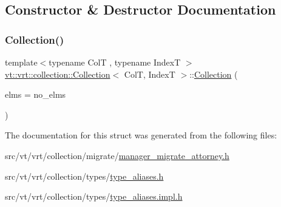\subsection{Constructor \& Destructor Documentation}
\mbox{\label{structvt_1_1vrt_1_1collection_1_1_collection_a1781c529f6184d1befe7e7d0781f6f50}} 
\subsubsection{\texorpdfstring{Collection()}{Collection()}}
{\footnotesize\ttfamily template$<$typename ColT , typename IndexT $>$ \\
\hyperlink{structvt_1_1vrt_1_1collection_1_1_collection}{vt\+::vrt\+::collection\+::\+Collection}$<$ ColT, IndexT $>$\+::\hyperlink{structvt_1_1vrt_1_1collection_1_1_collection}{Collection} (\begin{DoxyParamCaption}\item[{\hyperlink{namespacevt_ac115668758184050beff7a9281a2c490}{Virtual\+Elm\+Count\+Type} const}]{elms = {\ttfamily no\+\_\+elms} }\end{DoxyParamCaption})\hspace{0.3cm}{\ttfamily [explicit]}}



The documentation for this struct was generated from the following files\+:\begin{DoxyCompactItemize}
\item 
src/vt/vrt/collection/migrate/\hyperlink{manager__migrate__attorney_8h}{manager\+\_\+migrate\+\_\+attorney.\+h}\item 
src/vt/vrt/collection/types/\hyperlink{type__aliases_8h}{type\+\_\+aliases.\+h}\item 
src/vt/vrt/collection/types/\hyperlink{type__aliases_8impl_8h}{type\+\_\+aliases.\+impl.\+h}\end{DoxyCompactItemize}
